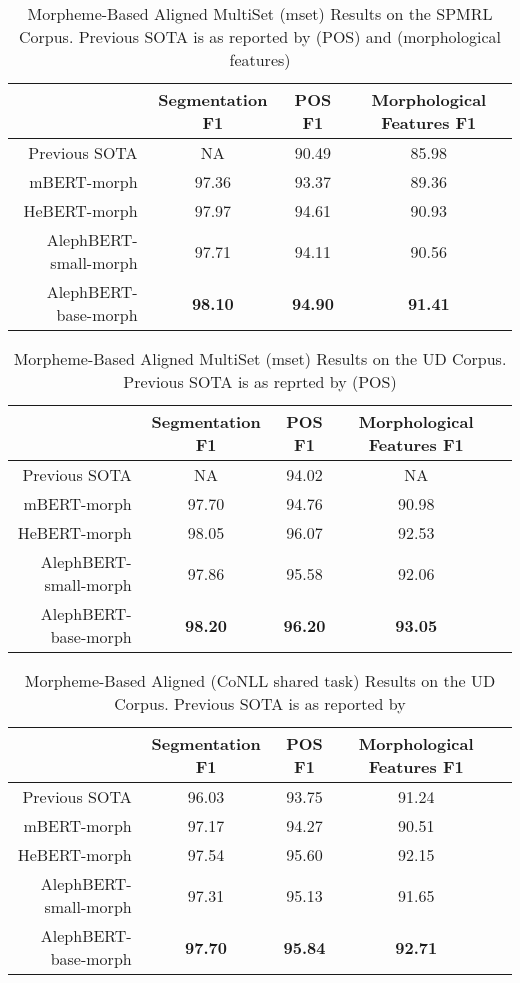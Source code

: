 \documentclass[11pt,a4paper]{article}
\begin{document}
\begin{table*}
\centering

\begin{tabular}{|r||ccc|}
\hline
    & Segmentation F1 & POS F1 & Morphological Features F1
    \\\hline  \hline
  Previous SOTA   & NA & 90.49 & 85.98 \\
  \hline
  mBERT-morph & 97.36 & 93.37 & 89.36 \\
  HeBERT-morph & 97.97 & 94.61 & 90.93 \\
    \hline
  AlephBERT-small-morph & 97.71 & 94.11 & 90.56 \\
  AlephBERT-base-morph & {\bf 98.10} & {\bf 94.90} & {\bf 91.41} \\
  \hline
\end{tabular}
\caption{Morpheme-Based Aligned MultiSet (mset) Results on the SPMRL Corpus. Previous SOTA is as reported by \cite{seker-tsarfaty-2020-pointer} (POS) and \cite{more2019tacl} (morphological features)
}\label{morph-results-spmrl-mset}
\end{table*}
\begin{table*}

\begin{tabular}{|r||cccc|}
\hline
    & Segmentation F1 & POS F1 & Morphological Features F1 &  
   \\\hline  \hline
  Previous SOTA   & NA & 94.02 & NA &   \\
    \hline
  mBERT-morph & 97.70 & 94.76 & 90.98 &   \\
  HeBERT-morph & 98.05 & 96.07 & 92.53 &   \\
    \hline
  AlephBERT-small-morph & 97.86 & 95.58 & 92.06 &   \\
  AlephBERT-base-morph & {\bf 98.20} & {\bf 96.20} & {\bf 93.05} &   \\
  \hline
\end{tabular}
\caption{Morpheme-Based Aligned MultiSet (mset) Results on the UD
Corpus. Previous SOTA is as reprted by \cite{seker-tsarfaty-2020-pointer} (POS)}\label{morph-results-ud-mset}
\end{table*}

\begin{table*}

\begin{tabular}{|r||cccc|}
\hline
    & Segmentation F1 & POS F1 & Morphological Features F1 & 
   \\\hline  \hline
  Previous SOTA   & 96.03 & 93.75 & 91.24 & \\
    \hline
  mBERT-morph & 97.17 & 94.27 & 90.51 &   \\
  HeBERT-morph & 97.54 & 95.60 & 92.15 &   \\
    \hline
  AlephBERT-small-morph & 97.31 & 95.13 & 91.65 &   \\
  AlephBERT-base-morph & {\bf 97.70} & {\bf 95.84} & {\bf 92.71} &   \\
  \hline
\end{tabular}

\caption{Morpheme-Based Aligned (CoNLL shared task) Results on the UD Corpus. Previous SOTA is as reported by \citet{nguyen2021trankit}}\label{morph-results-ud-conll}
\end{table*}
\end{document}
